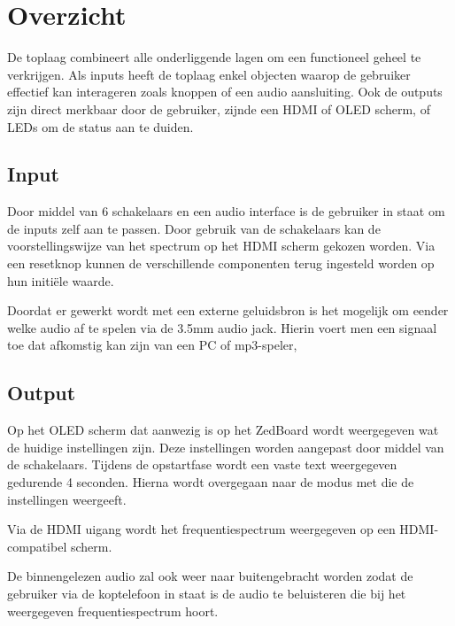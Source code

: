 \chapter{Overzicht}

\par De toplaag combineert alle onderliggende lagen om een functioneel geheel te verkrijgen.
Als inputs heeft de toplaag enkel objecten waarop de gebruiker effectief kan interageren zoals knoppen of een audio aansluiting.
Ook de outputs zijn direct merkbaar door de gebruiker, zijnde een HDMI of OLED scherm, of LEDs om de status aan te duiden.

\section{Input}

	\par Door middel van 6 schakelaars en een audio interface is de gebruiker in staat om de inputs zelf aan te passen. Door gebruik van de schakelaars kan de voorstellingswijze van het spectrum op het HDMI scherm gekozen worden. Via een resetknop kunnen de verschillende componenten terug ingesteld worden op hun initi\"ele waarde. 

	\par Doordat er gewerkt wordt met een externe geluidsbron is het mogelijk om eender welke audio af te spelen via de 3.5mm audio jack. Hierin voert men een signaal toe dat afkomstig kan zijn van een PC of mp3-speler, 

\section{Output}

	\par Op het OLED scherm dat aanwezig is op het ZedBoard wordt weergegeven wat de huidige instellingen zijn. Deze instellingen worden aangepast door middel van de schakelaars. Tijdens de opstartfase wordt een vaste text weergegeven gedurende 4 seconden. Hierna wordt overgegaan naar de modus met die de instellingen weergeeft.

	\par Via de HDMI uigang wordt het frequentiespectrum weergegeven op een HDMI-compatibel scherm. 

	\par De binnengelezen audio zal ook weer naar buitengebracht worden zodat de gebruiker via de koptelefoon in staat is de audio te beluisteren die bij het weergegeven frequentiespectrum hoort. 

